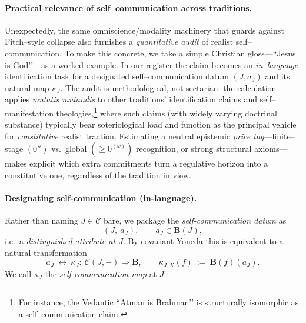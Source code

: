 \documentclass[11pt]{article}
\theoremstyle{upright}
\begin{document}
\paragraph{Practical relevance of self–communication across traditions.}
Unexpectedly, the same omniscience/modality machinery that guards against Fitch–style collapse also furnishes a \emph{quantitative audit} of realist self–communication. To make this concrete, we take a simple Christian gloss—“Jesus is God’’—as a worked example. In our register the claim becomes an \emph{in–language} identification task for a designated self–communication datum $(J,a_J)$ and its natural map $\kappa_J$. The audit is methodological, not sectarian: the calculation applies \emph{mutatis mutandis} to other traditions’ identification claims and self–manifestation theologies,\footnote{For instance, the Vedantic “Atman is Brahman’’ is structurally isomorphic as a self–communication claim.} where such claims (with widely varying doctrinal substance) typically bear soteriological load and function as the principal vehicle for \emph{constitutive} realist traction. Estimating a neutral epistemic \emph{price tag}—finite–stage $(0'')$ vs.\ global $(\ge 0^{(\omega)})$ recognition, or strong structural axioms—makes explicit which extra commitments turn a regulative horizon into a constitutive one, regardless of the tradition in view.

\paragraph{Designating self-communication (in-language).}
Rather than naming $J\in\mathcal C$ bare, we package the \emph{self-communication datum} as
\[
(J,\ a_J),\qquad a_J\in \mathbf B(J),
\]
i.e.\ a \emph{distinguished attribute at $J$}. By covariant Yoneda this is equivalent to a natural transformation
\[
a_J\ \longleftrightarrow\ \kappa_J:\ \mathcal C(J,-)\Longrightarrow \mathbf B,\qquad
\kappa_{J,X}(f)\ :=\ \mathbf B(f)(a_J).
\]
We call $\kappa_J$ the \emph{self-communication map} at $J$.
\end{document}
